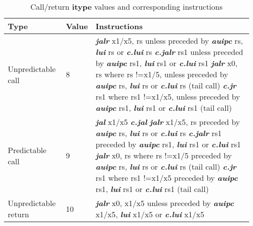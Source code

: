 \begin{table}[htp]
    \centering
    \caption{Call/return \textbf{itype} values and corresponding instructions}
    \label{tab:itype}
    \begin{tabulary}{\textwidth}{|l|l|p{80mm}|}
        \hline
        \textbf {Type} & \textbf {Value} & \textbf {Instructions} \\
        \hline
        Unpredictable call & 8 & \textit{\textbf {jalr}} x1/x5, rs unless preceded by \textit{\textbf {auipc}} rs, \textit{\textbf {lui}} rs or \textit{\textbf {c.lui}} rs\newline
\textit{\textbf {c.jalr}} rs1 unless preceded by \textit{\textbf {auipc}} rs1, \textit{\textbf {lui}} rs1 or \textit{\textbf {c.lui}} rs1\newline
\textit{\textbf {jalr}} x0, rs where rs !=x1/5, unless preceded by \textit{\textbf {auipc}} rs, \textit{\textbf {lui}} rs or \textit{\textbf {c.lui}} rs (tail call)\newline
\textit{\textbf {c.jr}} rs1 where rs1 !=x1/x5, unless preceded by \textit{\textbf {auipc}} rs1, \textit{\textbf {lui}} rs1 or \textit{\textbf {c.lui}} rs1 (tail call) \\
        \hline
        Predictable call & 9 & \textit{\textbf {jal}} x1/x5\newline
\textit{\textbf {c.jal}}\newline
\textit{\textbf {jalr}} x1/x5, rs preceded by \textit{\textbf {auipc}} rs, \textit{\textbf {lui}} rs or \textit{\textbf {c.lui}} rs\newline
\textit{\textbf {c.jalr}} rs1 preceded by \textit{\textbf {auipc}} rs1, \textit{\textbf {lui}} rs1 or \textit{\textbf {c.lui}} rs1\newline
\textit{\textbf {jalr}} x0, rs where rs !=x1/5 preceded by \textit{\textbf {auipc}} rs, \textit{\textbf {lui}} rs or \textit{\textbf {c.lui}} rs (tail call)\newline
\textit{\textbf {c.jr}} rs1 where rs1 !=x1/x5 preceded by \textit{\textbf {auipc}} rs1, \textit{\textbf {lui}} rs1 or \textit{\textbf {c.lui}} rs1 (tail call)\\
        \hline
        Unpredictable return & 10 & \textit{\textbf {jalr}} x0, x1/x5 unless preceded by \textit{\textbf {auipc}} x1/x5, \textit{\textbf {lui}} x1/x5 or \textit{\textbf {c.lui}} x1/x5\newline


\end{tabulary}
\end{table}
